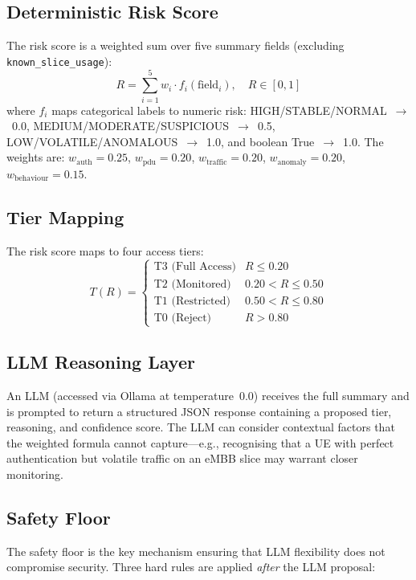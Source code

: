 \documentclass[conference]{IEEEtran}
\begin{document}
\subsection{Deterministic Risk Score}
The risk score is a weighted sum over five summary fields (excluding \texttt{known\_slice\_usage}):
\begin{equation}
    R = \sum_{i=1}^{5} w_i \cdot f_i(\text{field}_i), \quad R \in [0, 1]
\label{eq:risk_score}
\end{equation}
where $f_i$ maps categorical labels to numeric risk: HIGH/STABLE/NORMAL~$\to$~0.0, MEDIUM/MODERATE/SUSPICIOUS~$\to$~0.5, LOW/VOLATILE/ANOMALOUS~$\to$~1.0, and boolean True~$\to$~1.0. The weights are: $w_{\text{auth}}=0.25$, $w_{\text{pdu}}=0.20$, $w_{\text{traffic}}=0.20$, $w_{\text{anomaly}}=0.20$, $w_{\text{behaviour}}=0.15$.

\subsection{Tier Mapping}
The risk score maps to four access tiers:
\begin{equation}
    T(R) = \begin{cases}
        \text{T3 (Full Access)} & R \leq 0.20 \\
        \text{T2 (Monitored)} & 0.20 < R \leq 0.50 \\
        \text{T1 (Restricted)} & 0.50 < R \leq 0.80 \\
        \text{T0 (Reject)} & R > 0.80
    \end{cases}
\label{eq:tier_map}
\end{equation}

\subsection{LLM Reasoning Layer}
An LLM (accessed via Ollama at temperature~0.0) receives the full summary and is prompted to return a structured JSON response containing a proposed tier, reasoning, and confidence score. The LLM can consider contextual factors that the weighted formula cannot capture---e.g., recognising that a UE with perfect authentication but volatile traffic on an eMBB slice may warrant closer monitoring.

\subsection{Safety Floor}
The safety floor is the key mechanism ensuring that LLM flexibility does not compromise security. Three hard rules are applied \emph{after} the LLM proposal:
\end{document}
